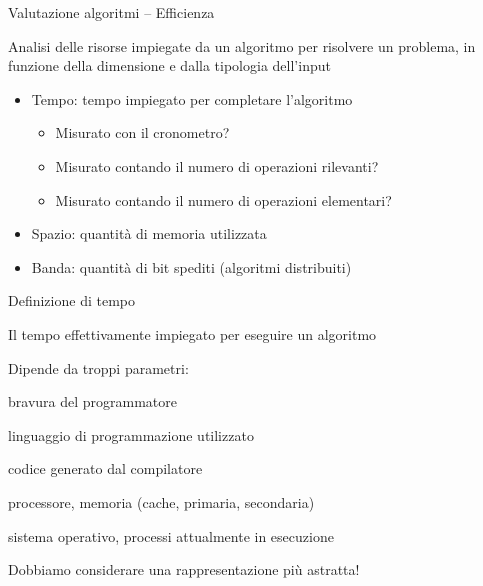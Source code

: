 \begin{frame}{Valutazione algoritmi -- Efficienza}
	
\vspace{-9pt}
\begin{myboxtitle}
Analisi delle \alert{risorse} impiegate da un algoritmo per risolvere un problema, in
funzione della \alert{dimensione} e dalla \alert{tipologia} dell'input
\end{myboxtitle}

\medskip

\begin{myboxtitle}[Risorse]
\begin{itemize}
\item \alert{Tempo}: tempo impiegato per completare l'algoritmo
\begin{itemize}
	\item Misurato con il cronometro?
	\item Misurato contando il numero di operazioni rilevanti?
	\item Misurato contando il numero di operazioni elementari?
\end{itemize}
\item \alert{Spazio}: quantità di memoria utilizzata
\item \alert{Banda}: quantità di bit spediti (algoritmi distribuiti)
\end{itemize}

\end{myboxtitle}

\end{frame}

\begin{frame}{Definizione di tempo}

\vspace{-9pt}
\begin{myboxtitle}
Il tempo effettivamente impiegato per eseguire un algoritmo
\end{myboxtitle}


\begin{mybox}
Dipende da troppi parametri:
\BI
\item bravura del programmatore
\item linguaggio di programmazione utilizzato
\item codice generato dal compilatore
\item processore, memoria (cache, primaria, secondaria)
\item sistema operativo, processi attualmente in esecuzione
\EI
\end{mybox}

\begin{mybox}
\alert{Dobbiamo considerare una rappresentazione più astratta!}
\end{mybox}

\end{frame}

